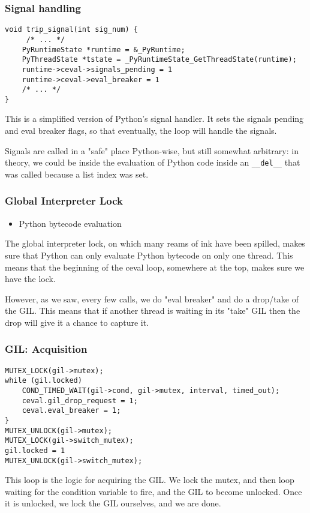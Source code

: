 \begin{frame}[fragile]
\frametitle{Signal handling}
\begin{lstlisting}
void trip_signal(int sig_num) {
     /* ... */
    PyRuntimeState *runtime = &_PyRuntime;
    PyThreadState *tstate = _PyRuntimeState_GetThreadState(runtime);
    runtime->ceval->signals_pending = 1
    runtime->ceval->eval_breaker = 1
    /* ... */
}
\end{lstlisting}
\end{frame}

This is a simplified version of Python's signal handler.
It sets the signals pending and eval breaker flags,
so that eventually,
the loop will handle the signals.

Signals are called in a
"safe"
place Python-wise,
but still somewhat arbitrary:
in theory,
we could be inside the evaluation of Python code inside
an \verb|__del__| that was called because a list index was set.


\begin{frame}
\frametitle{Global Interpreter Lock}

\begin{itemize}
\item Python bytecode evaluation
\end{itemize}
\end{frame}

The global interpreter lock,
on which many reams of ink have been spilled,
makes sure that Python can only evaluate Python bytecode
on only one thread.
This means that the beginning of the ceval loop,
somewhere at the top,
makes sure we have the lock.

However,
as we saw,
every few calls,
we do "eval breaker"
and do a drop/take of the GIL.
This means that if another thread is waiting in its
"take"
GIL then the drop will give it a chance to capture it.

\begin{frame}[fragile]
\frametitle{GIL: Acquisition}
\begin{lstlisting}
MUTEX_LOCK(gil->mutex);
while (gil.locked)
    COND_TIMED_WAIT(gil->cond, gil->mutex, interval, timed_out);
    ceval.gil_drop_request = 1;
    ceval.eval_breaker = 1;
}
MUTEX_UNLOCK(gil->mutex);
MUTEX_LOCK(gil->switch_mutex);
gil.locked = 1
MUTEX_UNLOCK(gil->switch_mutex);
\end{lstlisting}
\end{frame}

This loop is the logic for acquiring the GIL.
We lock the mutex,
and then loop waiting for the condition variable to fire,
and the GIL to become unlocked.
Once it is unlocked,
we lock the GIL ourselves,
and we are done.


